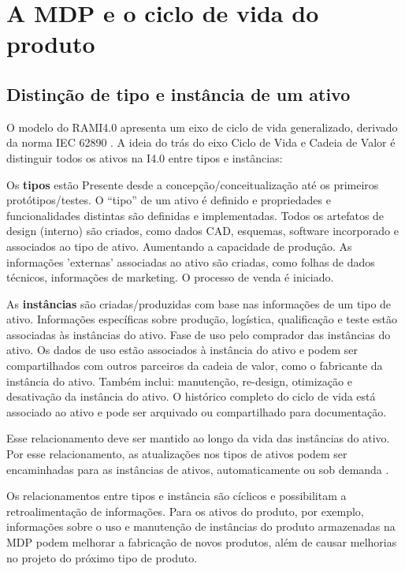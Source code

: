 \chapter{A MDP e o ciclo de vida do produto}

\section{Distinção de tipo e instância de um ativo}

	O modelo do RAMI4.0 apresenta um eixo de ciclo de vida generalizado, derivado da norma IEC 62890 \cite{adolphs2015rami}. A ideia do trás do eixo Ciclo de Vida e Cadeia de Valor é distinguir todos os ativos na I4.0 entre tipos e instâncias:
	
	Os \textbf{tipos} estão Presente desde a concepção/conceitualização até os primeiros protótipos/testes. O ``tipo'' de um ativo é definido e propriedades e funcionalidades distintas são definidas e implementadas. Todos os artefatos de design (interno) são criados, como dados CAD, esquemas, software incorporado e associados ao tipo de ativo. Aumentando a capacidade de produção. As informações 'externas' associadas ao ativo são criadas, como folhas de dados técnicos, informações de marketing. O processo de venda é iniciado.
		
	As \textbf{instâncias} são criadas/produzidas com base nas informações de um tipo de ativo. Informações específicas sobre produção, logística, qualificação e teste estão associadas às instâncias do ativo. Fase de uso pelo comprador das instâncias do ativo. Os dados de uso estão associados à instância do ativo e podem ser compartilhados com outros parceiros da cadeia de valor, como o fabricante da instância do ativo. Também inclui: manutenção, re-design, otimização e desativação da instância do ativo. O histórico completo do ciclo de vida está associado ao ativo e pode ser arquivado ou compartilhado para documentação.

	Esse relacionamento deve ser mantido ao longo da vida das instâncias do ativo. Por esse relacionamento, as atualizações nos tipos de ativos podem ser encaminhadas para as instâncias de ativos, automaticamente ou sob demanda \cite{bader2019aas}.
	
	Os relacionamentos entre tipos e instância são cíclicos e possibilitam a retroalimentação de informações. Para os ativos do produto, por exemplo, informações sobre o uso e manutenção de instâncias do produto armazenadas na MDP podem melhorar a fabricação de novos produtos, além de causar melhorias no projeto do próximo tipo de produto.
	

